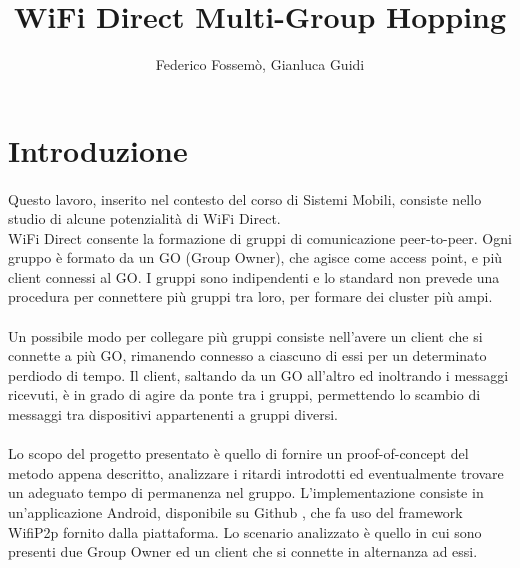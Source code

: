 \documentclass{llncs}
\begin{document}
	\mainmatter              %
	\title{WiFi Direct Multi-Group Hopping}
	\author{Federico Fossemò, Gianluca Guidi}
	\maketitle
	

\section{Introduzione}

\paragraph{} Questo lavoro, inserito nel contesto del corso di Sistemi Mobili, consiste nello studio di alcune potenzialità di WiFi Direct.\\
WiFi Direct consente la formazione di gruppi di comunicazione peer-to-peer. Ogni gruppo è formato da un GO (Group Owner), che agisce come access point, e più client connessi al GO. I gruppi sono indipendenti e lo standard non prevede una procedura per connettere più gruppi tra loro, per formare dei cluster più ampi.

\paragraph{} Un possibile modo per collegare più gruppi consiste nell'avere un client che si connette a più GO, rimanendo connesso a ciascuno di essi per un determinato perdiodo di tempo. Il client, saltando da un GO all'altro ed inoltrando i messaggi ricevuti, è in grado di agire da ponte tra i gruppi, permettendo lo scambio di messaggi tra dispositivi appartenenti a gruppi diversi.

\paragraph{} Lo scopo del progetto presentato è quello di fornire un proof-of-concept del metodo appena descritto, analizzare i ritardi introdotti ed eventualmente trovare un adeguato tempo di permanenza nel gruppo. L'implementazione consiste in un'applicazione Android, disponibile su Github \cite{codice}, che fa uso del framework WifiP2p fornito dalla piattaforma. Lo scenario analizzato è quello in cui sono presenti due Group Owner ed un client che si connette in alternanza ad essi.
\end{document}

